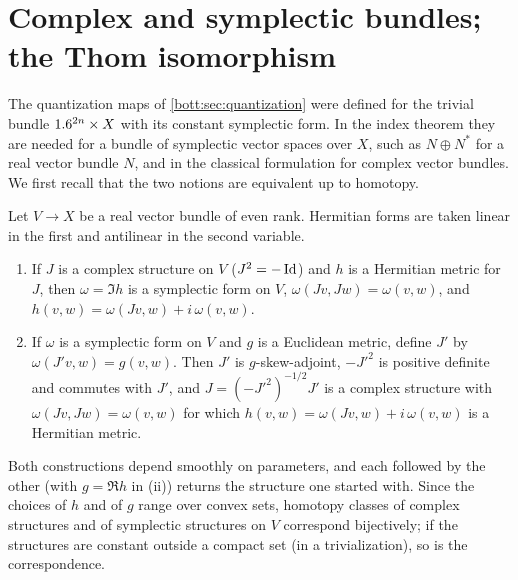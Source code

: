 \section{Complex and symplectic bundles; the Thom isomorphism}\label{bott:sec:thom}

The quantization maps of \cref{bott:sec:quantization} were defined for the trivial
bundle $1.6^{2n}\times X$ with its constant symplectic form. In the index theorem they are
needed for a bundle of symplectic vector spaces over $X$, such as $N\oplus N^*$ for a
real vector bundle $N$, and in the classical formulation for complex vector bundles. We
first recall that the two notions are equivalent up to homotopy.

\begin{lemma}\label{bott:lem:complex-symplectic}
  Let $V\to X$ be a real vector bundle of even rank. Hermitian forms are taken linear in
  the first and antilinear in the second variable.
  \begin{enumerate}[label=(\roman*)]
  \item If $J$ is a complex structure on $V$ ($J^2=-\operatorname{Id}$) and $h$ is a Hermitian metric for
    $J$, then $\omega=\Im h$ is a symplectic form on $V$, $\omega(Jv,Jw)=\omega(v,w)$, and
    $h(v,w)=\omega(Jv,w)+i\,\omega(v,w)$.
  \item If $\omega$ is a symplectic form on $V$ and $g$ is a Euclidean metric, define $J'$ by
    $\omega(J'v,w)=g(v,w)$. Then $J'$ is $g$-skew-adjoint, $-J'^2$ is positive definite and
    commutes with $J'$, and $J=(-J'^2)^{-1/2}J'$ is a complex structure with
    $\omega(Jv,Jw)=\omega(v,w)$ for which $h(v,w)=\omega(Jv,w)+i\,\omega(v,w)$ is a Hermitian metric.
  \end{enumerate}
  Both constructions depend smoothly on parameters, and each followed by the other (with
  $g=\Re h$ in (ii)) returns the structure one started with. Since the choices of $h$ and of
  $g$ range over convex sets, homotopy classes of complex structures and of symplectic
  structures on $V$ correspond bijectively; if the structures are constant outside a
  compact set (in a trivialization), so is the correspondence.
\end{lemma}
